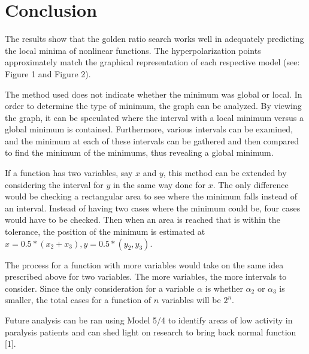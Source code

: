 \documentclass[linenumbers,RNAAS,trackchanges]{aastex631}
\begin{document}
\section{Conclusion} \label{sec:conclusion}
The results show that the golden ratio search works well in adequately predicting the local minima of nonlinear functions. The hyperpolarization points approximately match the graphical representation of each respective model (see: Figure 1 and Figure 2).

The method used does not indicate whether the minimum was global or local. In order to determine the type of minimum, the graph can be analyzed. By viewing the graph, it can be speculated where the interval with a local minimum versus a global minimum is contained. Furthermore, various intervals can be examined, and the minimum at each of these intervals can be gathered and then compared to find the minimum of the minimums, thus revealing a global minimum.

If a function has two variables, say $x$ and $y$, this method can be extended by considering the interval for $y$ in the same way done for $x$. The only difference would be checking a rectangular area to see where the minimum falls instead of an interval. Instead of having two cases where the minimum could be, four cases would have to be checked. Then when an area is reached that is within the tolerance, the position of the minimum is estimated at $x = 0.5 * (x_2 + x_3), y = 0.5 * (y_2, y_3)$.

The process for a function with more variables would take on the same idea prescribed above for two variables. The more variables, the more intervals to consider. Since the only consideration for a variable $\alpha$ is whether $\alpha_2$ or $\alpha_3$ is smaller, the total cases for a function of $n$ variables will be $2^n$.

Future analysis can be ran using Model 5/4 to identify areas of low activity in paralysis patients and can shed light on research to bring back normal function [1]. 
\end{document}
